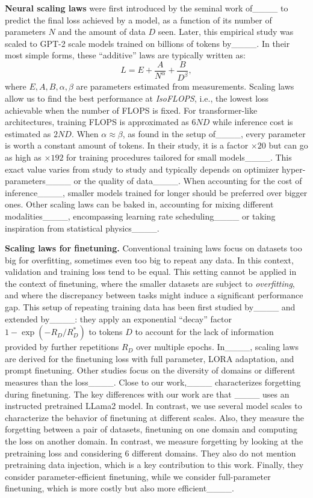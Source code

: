 \textbf{Neural scaling laws} were first introduced by the seminal work of____ to predict the final loss achieved by a model, as a function of its number of parameters $N$ and the amount of data $D$ seen. Later, this empirical study was scaled to GPT-2 scale models trained on billions of tokens by____. In their most simple forms, these ``additive'' laws are typically written as:
\begin{equation}
    L=E+\frac{A}{N^{\alpha}}+\frac{B}{D^{\beta}},
\end{equation}
where $E,A,B,\alpha,\beta$ are parameters estimated from measurements.  
Scaling laws allow us to find the best performance at \textit{
IsoFLOPS}, i.e., the lowest loss achievable when the number of FLOPS is fixed. For transformer-like architectures, training FLOPS is approximated as $6ND$ while inference cost is estimated as $2ND$.  
When $\alpha\approx\beta$, as found in the setup of____, every parameter is worth a constant amount of tokens. In their study, it is a factor $\times20$ but can go as high as $\times 192$ for training procedures tailored for small models____. This exact value varies from study to study and typically depends on optimizer hyper-parameters____ or the quality of data____. When accounting for the cost of inference____, smaller models trained for longer should be preferred over bigger ones. Other scaling laws can be baked in, accounting for mixing different modalities____, encompassing learning rate scheduling____ or taking inspiration from statistical physics____.  


\textbf{Scaling laws for finetuning.} Conventional training laws focus on datasets too big for overfitting, sometimes even too big to repeat any data. In this context, validation and training loss tend to be equal. This setting cannot be applied in the context of finetuning, where the smaller datasets are subject to \textit{overfitting}, and where the discrepancy between tasks might induce a significant performance gap. This setup of repeating training data has been first studied by____ and extended by____: they apply an exponential ``decay'' factor $1-\exp{(-{R_D}/{R_D^*})}$ to tokens $D$ to account for the lack of information provided by further repetitions $R_D$ over multiple epochs. In____, scaling laws are derived for the finetuning loss with full parameter, LORA adaptation, and prompt finetuning.
Other studies focus on the diversity of domains or different measures than the loss____. 
Close to our work,____ characterizes forgetting during finetuning. 
The key differences with our work are that ____ uses an instructed pretrained LLama2 model. In contrast, we use several model scales to characterize the behavior of finetuning at different scales. 
Also, they measure the forgetting between a pair of datasets, finetuning on one domain and computing the loss on another domain.
In contrast, we measure forgetting by looking at the pretraining loss and considering 6 different domains.
They also do not mention pretraining data injection, which is a key contribution to this work. 
Finally, they consider parameter-efficient finetuning, while we consider full-parameter finetuning, which is more costly but also more efficient____.

